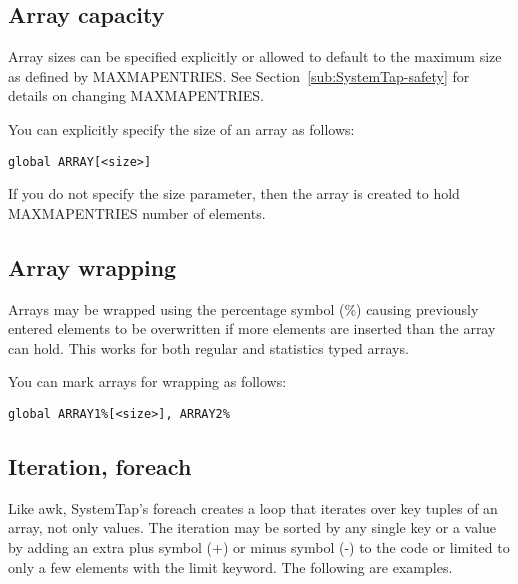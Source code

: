 \documentclass[twoside,english]{article}
\newenvironment{vindent}
{\begin{list}{}{\setlength{\listparindent}{6pt}}
\item[]}
{\end{list}}
\begin{document}
\subsection{Array capacity}

Array sizes can be specified explicitly or allowed to default to the maximum
size as defined by MAXMAPENTRIES. See Section~\ref{sub:SystemTap-safety}
for details on changing MAXMAPENTRIES.

You can explicitly specify the size of an array as follows:

\begin{vindent}
\begin{verbatim}
global ARRAY[<size>]
\end{verbatim}
\end{vindent}
If you do not specify the size parameter, then the array is created to hold
MAXMAPENTRIES number of elements.

\subsection{Array wrapping\label{sub:Array-Wrapping}}

Arrays may be wrapped using the percentage symbol (\%) causing previously entered
elements to be overwritten if more elements are inserted than the array can
hold. This works for both regular and statistics typed arrays.

You can mark arrays for wrapping as follows:

\begin{vindent}
\begin{verbatim}
global ARRAY1%[<size>], ARRAY2%
\end{verbatim}
\end{vindent}

\subsection{Iteration, foreach}
Like awk, SystemTap's foreach creates a loop that iterates over key tuples
of an array, not only values. The iteration may be sorted by any single key
or a value by adding an extra plus symbol (+) or minus symbol (-) to the
code or limited to only a few elements with the limit keyword.
The following are examples.
\end{document}
